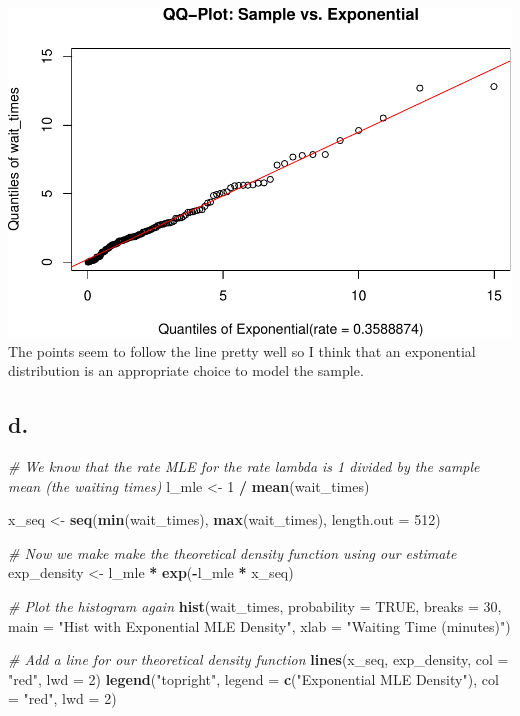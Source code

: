 \documentclass[
]{article}
\newenvironment{Shaded}{\begin{snugshade}}{\end{snugshade}}
\newcommand{\AttributeTok}[1]{\textcolor[rgb]{0.13,0.29,0.53}{#1}}
\newcommand{\CommentTok}[1]{\textcolor[rgb]{0.56,0.35,0.01}{\textit{#1}}}
\newcommand{\ConstantTok}[1]{\textcolor[rgb]{0.56,0.35,0.01}{#1}}
\newcommand{\DecValTok}[1]{\textcolor[rgb]{0.00,0.00,0.81}{#1}}
\newcommand{\FunctionTok}[1]{\textcolor[rgb]{0.13,0.29,0.53}{\textbf{#1}}}
\newcommand{\NormalTok}[1]{#1}
\newcommand{\OtherTok}[1]{\textcolor[rgb]{0.56,0.35,0.01}{#1}}
\newcommand{\SpecialCharTok}[1]{\textcolor[rgb]{0.81,0.36,0.00}{\textbf{#1}}}
\newcommand{\StringTok}[1]{\textcolor[rgb]{0.31,0.60,0.02}{#1}}
\begin{document}
\includegraphics{SDA_submission_template_files/figure-latex/unnamed-chunk-4-1.pdf}
The points seem to follow the line pretty well so I think that an
exponential distribution is an appropriate choice to model the sample.

\subsection{d.}\label{d.}

\begin{Shaded}
\begin{Highlighting}[]
\CommentTok{\# We know that the rate MLE for the rate lambda is 1 divided by the sample mean (the waiting times)}
\NormalTok{l\_mle }\OtherTok{\textless{}{-}} \DecValTok{1} \SpecialCharTok{/} \FunctionTok{mean}\NormalTok{(wait\_times)}

\NormalTok{x\_seq }\OtherTok{\textless{}{-}} \FunctionTok{seq}\NormalTok{(}\FunctionTok{min}\NormalTok{(wait\_times), }\FunctionTok{max}\NormalTok{(wait\_times), }\AttributeTok{length.out =} \DecValTok{512}\NormalTok{)}

\CommentTok{\# Now we make make the theoretical density function using our estimate}
\NormalTok{exp\_density }\OtherTok{\textless{}{-}}\NormalTok{ l\_mle }\SpecialCharTok{*} \FunctionTok{exp}\NormalTok{(}\SpecialCharTok{{-}}\NormalTok{l\_mle }\SpecialCharTok{*}\NormalTok{ x\_seq)}

\CommentTok{\# Plot the histogram again}
\FunctionTok{hist}\NormalTok{(wait\_times, }\AttributeTok{probability =} \ConstantTok{TRUE}\NormalTok{, }\AttributeTok{breaks =} \DecValTok{30}\NormalTok{, }\AttributeTok{main =} \StringTok{"Hist with Exponential MLE Density"}\NormalTok{, }\AttributeTok{xlab =} \StringTok{"Waiting Time (minutes)"}\NormalTok{)}

\CommentTok{\# Add a line for our theoretical density function}
\FunctionTok{lines}\NormalTok{(x\_seq, exp\_density, }\AttributeTok{col =} \StringTok{"red"}\NormalTok{, }\AttributeTok{lwd =} \DecValTok{2}\NormalTok{)}
\FunctionTok{legend}\NormalTok{(}\StringTok{"topright"}\NormalTok{, }\AttributeTok{legend =} \FunctionTok{c}\NormalTok{(}\StringTok{"Exponential MLE Density"}\NormalTok{), }\AttributeTok{col =} \StringTok{"red"}\NormalTok{, }\AttributeTok{lwd =} \DecValTok{2}\NormalTok{)}
\end{Highlighting}
\end{Shaded}
\end{document}
